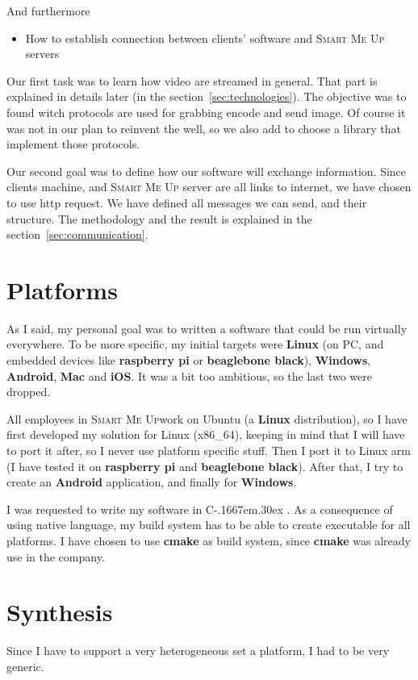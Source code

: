 \documentclass[a4paper,11pt]{custom}
\newcommand{\smu}{\textsc{Smart Me Up}}
\newcommand{\cmake}{\textbf{cmake}\xspace}
\newcommand{\rpi}{\textbf{raspberry pi}\xspace}
\newcommand{\bbb}{\textbf{beaglebone black}\xspace}
\newcommand{\linux}{\textbf{Linux}\xspace}
\newcommand{\win}{\textbf{Windows}\xspace}
\newcommand{\mac}{\textbf{Mac}\xspace}
\newcommand{\android}{\textbf{Android}\xspace}
\newcommand{\ios}{\textbf{iOS}\xspace}
\newcommand{\cpp}{%
  C\kern-.1667em\raise.30ex\hbox{\smaller{++}\xspace}%
  \spacefactor1000%
}
\begin{document}
And furthermore
\begin{itemize}
\item How to establish connection between clients' software and \smu{} servers
\end{itemize}

Our first task was to learn how video are streamed in general. That part is
explained in details later (in the section~\ref{sec:technologies}). The objective
was to found witch protocols are used for grabbing encode and send image. Of
course it was not in our plan to reinvent the well, so we also add to choose a
library that implement those protocols.

Our second goal was to define how our software will exchange information. Since
clients machine, and \smu{} server are all links to internet, we have chosen to
use http request. We have defined all messages we can send, and their
structure. The methodology and the result is explained in the
section~\ref{sec:communication}.

\section{Platforms}

As I said, my personal goal was to written a software that could be run virtually
everywhere. To be more specific, my initial targets were \linux{} (on PC, and
embedded devices like \rpi or \bbb), \win, \android, \mac{} and \ios. It was a
bit too ambitious, so the last two were dropped.

All employees in \smu work on Ubuntu (a \linux{} distribution), so I have first
developed my solution for Linux (x86_64), keeping in mind that I will have to port it
after, so I never use platform specific stuff. Then I port it to Linux arm (I
have tested it on \rpi{} and \bbb). After that, I try to create an \android{}
application, and finally for \win.

I was requested to write my software in \cpp. As a consequence of using native
language, my build system has to be able to create executable for all
platforms. I have chosen to use \cmake{} as build system, since \cmake{} was
already use in the company.

\section{Synthesis}

Since I have to support a very heterogeneous set a platform, I had to be very
generic.
\end{document}
